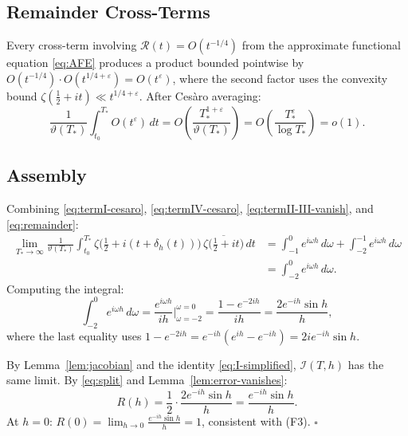 \documentclass[11pt]{article}
\theoremstyle{plain}
\theoremstyle{definition}
\begin{document}
\subsection*{Remainder Cross-Terms}

Every cross-term involving $\mathcal{R}(t)=O(t^{-1/4})$ from the
approximate functional equation \eqref{eq:AFE}
produces a product bounded pointwise by
$O(t^{-1/4})\cdot O(t^{1/4+\varepsilon}) = O(t^{\varepsilon})$,
where the second factor uses the convexity bound
$\zeta(\tfrac{1}{2}+it)\ll t^{1/4+\varepsilon}$.
After Ces\`aro averaging:
\begin{equation}\label{eq:remainder}
\frac{1}{\vartheta(T_*)}
\int_{t_0}^{T_*} O(t^{\varepsilon})\,dt
= O\!\left(\frac{T_*^{1+\varepsilon}}{\vartheta(T_*)}\right)
= O\!\left(\frac{T_*^{\varepsilon}}{\log T_*}\right)
= o(1).
\end{equation}

\subsection*{Assembly}

Combining \eqref{eq:termI-cesaro}, \eqref{eq:termIV-cesaro},
\eqref{eq:termII-III-vanish}, and \eqref{eq:remainder}:
\begin{align*}
\lim_{T_*\to\infty}
\frac{1}{\vartheta(T_*)}
\int_{t_0}^{T_*}
\zeta\bigl(\tfrac{1}{2}+i(t+\delta_h(t))\bigr)\,
\overline{\zeta\bigl(\tfrac{1}{2}+it\bigr)}
\,dt
&= \int_{-1}^0 e^{i\omega h}\,d\omega
 + \int_{-2}^{-1} e^{i\omega h}\,d\omega\\
&= \int_{-2}^0 e^{i\omega h}\,d\omega.
\end{align*}
Computing the integral:
\[
\int_{-2}^0 e^{i\omega h}\,d\omega
= \frac{e^{i\omega h}}{ih}\bigg|_{\omega=-2}^{\omega=0}
= \frac{1-e^{-2ih}}{ih}
= \frac{2e^{-ih}\sin h}{h},
\]
where the last equality uses $1-e^{-2ih} = e^{-ih}(e^{ih}-e^{-ih})
= 2ie^{-ih}\sin h$.

By Lemma~\ref{lem:jacobian} and the identity \eqref{eq:I-simplified},
$\mathcal{I}(T,h)$ has the same limit.
By \eqref{eq:split} and Lemma~\ref{lem:error-vanishes}:
\[
R(h)
= \frac{1}{2}\cdot\frac{2e^{-ih}\sin h}{h}
= \frac{e^{-ih}\sin h}{h}.
\]
At $h=0$:
$R(0) = \lim_{h\to 0}\frac{e^{-ih}\sin h}{h} = 1$,
consistent with (F3).
\hfill$\square$
\end{document}
